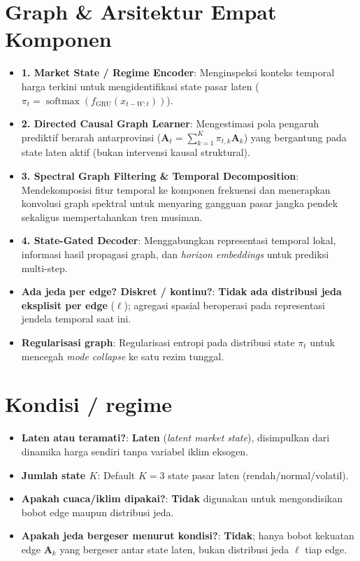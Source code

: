 \documentclass[11pt,a4paper]{article}
\begin{document}
\section{Graph \& Arsitektur Empat Komponen}
\begin{itemize}
  \item \textbf{1. Market State / Regime Encoder}: Menginspeksi konteks temporal harga terkini untuk mengidentifikasi state pasar laten ($\pi_t = \operatorname{softmax}(f_{\text{GRU}}(x_{t-W:t}))$).
  \item \textbf{2. Directed Causal Graph Learner}: Mengestimasi pola pengaruh prediktif berarah antarprovinsi ($\mathbf{A}_t = \sum_{k=1}^K \pi_{t,k} \mathbf{A}_k$) yang bergantung pada state laten aktif (bukan intervensi kausal struktural).
  \item \textbf{3. Spectral Graph Filtering \& Temporal Decomposition}: Mendekomposisi fitur temporal ke komponen frekuensi dan menerapkan konvolusi graph spektral untuk menyaring gangguan pasar jangka pendek sekaligus mempertahankan tren musiman.
  \item \textbf{4. State-Gated Decoder}: Menggabungkan representasi temporal lokal, informasi hasil propagasi graph, dan \emph{horizon embeddings} untuk prediksi multi-step.
  \item \textbf{Ada jeda per edge? Diskret / kontinu?}: \textbf{Tidak ada distribusi jeda eksplisit per edge} ($\ell$); agregasi spasial beroperasi pada representasi jendela temporal saat ini.
  \item \textbf{Regularisasi graph}: Regularisasi entropi pada distribusi state $\pi_t$ untuk mencegah \emph{mode collapse} ke satu rezim tunggal.
\end{itemize}

\section{Kondisi / regime}
\begin{itemize}
  \item \textbf{Laten atau teramati?}: \textbf{Laten} (\emph{latent market state}), disimpulkan dari dinamika harga sendiri tanpa variabel iklim eksogen.
  \item \textbf{Jumlah state $K$}: Default $K = 3$ state pasar laten (rendah/normal/volatil).
  \item \textbf{Apakah cuaca/iklim dipakai?}: \textbf{Tidak} digunakan untuk mengondisikan bobot edge maupun distribusi jeda.
  \item \textbf{Apakah jeda bergeser menurut kondisi?}: \textbf{Tidak}; hanya bobot kekuatan edge $\mathbf{A}_k$ yang bergeser antar state laten, bukan distribusi jeda $\ell$ tiap edge.
\end{itemize}
\end{document}
